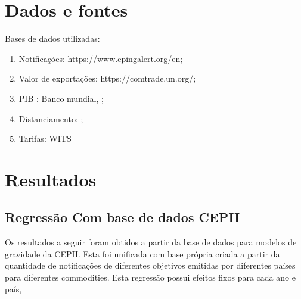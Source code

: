 \documentclass[12pt, a4paper]{article}
\begin{document}
\section{Dados e fontes}

Bases de dados utilizadas:

\begin{enumerate}
    \item Notificações: https://www.epingalert.org/en;
    \item Valor de exportações: https://comtrade.un.org/;
    \item PIB : Banco mundial, \cite{WB};
    \item Distanciamento: \cite{CEPII};
    \item Tarifas: WITS
\end{enumerate}

\section{Resultados}

\subsection{Regressão Com base de dados CEPII}

Os resultados a seguir foram obtidos a partir da base de dados para modelos de gravidade da CEPII. Esta foi unificada com base própria criada a partir da quantidade de notificações de diferentes objetivos emitidas por diferentes países para diferentes commodities. Esta regressão possui efeitos fixos para cada ano e país,



\printbibliography
\end{document}
